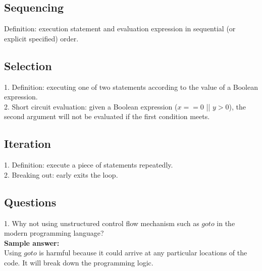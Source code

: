 \documentclass[11pt]{article}
\begin{document}
\subsection{Sequencing}
Definition: execution statement and evaluation expression in sequential (or explicit specified) order.
\subsection{Selection}
1. Definition: executing one of two statements according to the value of a Boolean expression.\\
2. Short circuit evaluation: given a Boolean expression ($x == 0$ || $y > 0$), the second argument will not be evaluated if the first condition meets.
\subsection{Iteration}
1. Definition: execute a piece of statements repeatedly.\\
2. Breaking out: early exits the loop.
\subsection{Questions}
1. Why not using unstructured control flow mechanism such as $goto$ in the modern programming language?\\
\textbf{ Sample answer:}\\
Using $goto$ is harmful because it could arrive at any particular locations of the code. It will break down the programming logic.
\end{document}
